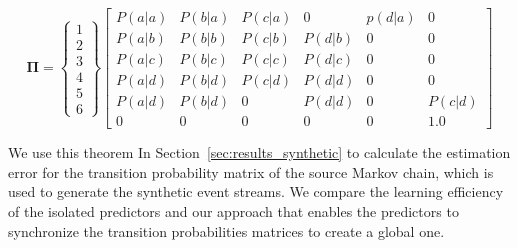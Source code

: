 \begin{equation}
\label{eq:matrix}
\boldsymbol{\Pi} = 
\begin{Bmatrix} 
 1          \\ 2        \\3             \\4         \\5         \\ 6 
\end{Bmatrix}
\begin{bmatrix} 
P(a|a) 	& P(b|a) 		& P(c|a) 		& 0			  & p(d|a) 	& 0  \\
P(a|b) 	& P(b|b) 		& P(c|b) 		& P(d|b)	  & 0 	    & 0  \\
P(a|c) 	& P(b|c) 		& P(c|c) 		& P(d|c) 	  & 0 	    & 0  \\
P(a|d) 	& P(b|d) 		& P(c|d) 		& P(d|d)	  & 0 	    & 0  \\
P(a|d) 	& P(b|d) 		&  0	 	    & P(d|d)	  & 0 	    & P(c|d)  \\
0			& 0			& 0		        & 0    		  & 0		& 1.0
\end{bmatrix}
\end{equation} 


\par We use this theorem In Section~\ref{sec:results_synthetic} to calculate the estimation error for the transition probability matrix of the source Markov chain, which is used to generate the synthetic event streams. We compare the learning efficiency of the isolated \pmcmr predictors and our approach that enables the \pmcmr predictors to synchronize the transition probabilities matrices to create a global one. 
